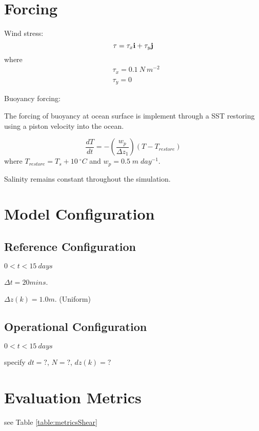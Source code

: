 \documentclass[fleqn, 12pt]{report}
\begin{document}
\section{Forcing}

Wind stress:
\begin{equation*}
{\bf \tau} = \tau_x {\bf i} + \tau_y {\bf j} \\
\end{equation*}
where
\begin{align*}
&\tau_x= 0.1 \ N \ m^{-2} \\
&\tau_y=0
\end{align*}

Buoyancy forcing:

The forcing of buoyancy at ocean surface is implement through a SST restoring using a piston velocity into the ocean.

\begin{equation}
\frac{d T}{dt} = - \left( \frac{w_p}{\Delta z_1} \right) \left(T - T_{restore} \right)
\end{equation}
where $T_{restore}=T_s+10\ ^{\circ}C$ and $w_p = 0.5 \;m\;day^{-1}$.

Salinity remains constant throughout the simulation.

\section{Model Configuration}
\subsection{Reference Configuration}
 $0<t<15 \ days$

 $\Delta t = 20 mins$.

 $\Delta z(k) = 1.0 m$. (Uniform)
 

\subsection{Operational Configuration}
 $0<t<15 \ days$
 
 specify $dt=?$, $N=?$, $dz(k)=?$

\section{Evaluation Metrics}
see Table \ref{table:metricsShear}
\end{document}
